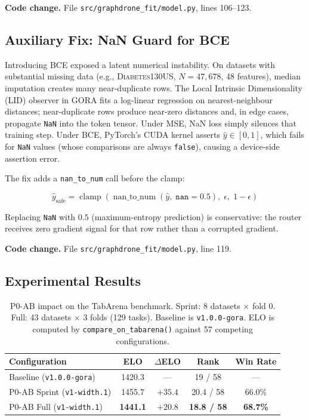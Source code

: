 \noindent\textbf{Code change.}
File \texttt{src/graphdrone\_fit/model.py}, lines 106--123.

\subsection{Auxiliary Fix: NaN Guard for BCE}
\label{sec:nan_guard}

Introducing BCE exposed a latent numerical instability.
On datasets with substantial missing data (e.g., \textsc{Diabetes130US},
$N=47{,}678$, 48 features), median imputation creates many
near-duplicate rows.
The Local Intrinsic Dimensionality (LID) observer in GORA fits a
log-linear regression on nearest-neighbour distances; near-duplicate
rows produce near-zero distances and, in edge cases, propagate
\texttt{NaN} into the token tensor.
Under MSE, NaN loss simply silences that training step.
Under BCE, PyTorch's CUDA kernel asserts $\hat{y} \in [0,1]$, which
fails for \texttt{NaN} values (whose comparisons are always
\texttt{false}), causing a device-side assertion error.

The fix adds a \texttt{nan\_to\_num} call before the clamp:

\begin{equation}
    \hat{y}_{\text{safe}} =
    \operatorname{clamp}\!\left(
        \operatorname{nan\_to\_num}(\hat{y},\; \texttt{nan}=0.5),\;
        \epsilon,\; 1-\epsilon
    \right)
    \label{eq:nan_guard}
\end{equation}

Replacing \texttt{NaN} with $0.5$ (maximum-entropy prediction) is
conservative: the router receives zero gradient signal for that row
rather than a corrupted gradient.

\noindent\textbf{Code change.}
File \texttt{src/graphdrone\_fit/model.py}, line 119.

\subsection{Experimental Results}
\label{sec:p0_results}

\begin{table}[h]
\centering
\caption{%
    P0-AB impact on the TabArena benchmark.
    Sprint: 8 datasets $\times$ fold 0.
    Full: 43 datasets $\times$ 3 folds (129 tasks).
    Baseline is \texttt{v1.0.0-gora}.
    ELO is computed by \texttt{compare\_on\_tabarena()}
    against 57 competing configurations.
}
\label{tab:p0_results}
\begin{tabular}{lcccc}
\toprule
Configuration & ELO & $\Delta$ELO & Rank & Win Rate \\
\midrule
Baseline (\texttt{v1.0.0-gora}) & 1420.3 & — & 19 / 58 & — \\
P0-AB Sprint (\texttt{v1-width.1}) & 1455.7 & $+35.4$ & 20.4 / 58 & 66.0\% \\
P0-AB Full (\texttt{v1-width.1}) & \textbf{1441.1} & $\mathbf{+20.8}$ & \textbf{18.8 / 58} & \textbf{68.7\%} \\
\bottomrule
\end{tabular}
\end{table}

